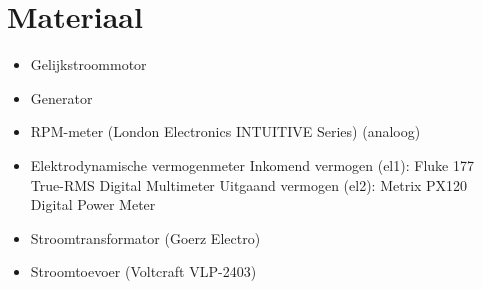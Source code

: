 \section{Materiaal}
\begin{itemize}
    \item Gelijkstroommotor
    \item Generator
    \item RPM-meter (London Electronics INTUITIVE Series) (analoog)
    \item Elektrodynamische vermogenmeter
        Inkomend vermogen (el1): Fluke 177 True-RMS Digital Multimeter
        Uitgaand vermogen (el2): Metrix PX120 Digital Power Meter
    \item Stroomtransformator (Goerz Electro)
    \item Stroomtoevoer (Voltcraft VLP-2403)
\end{itemize}
